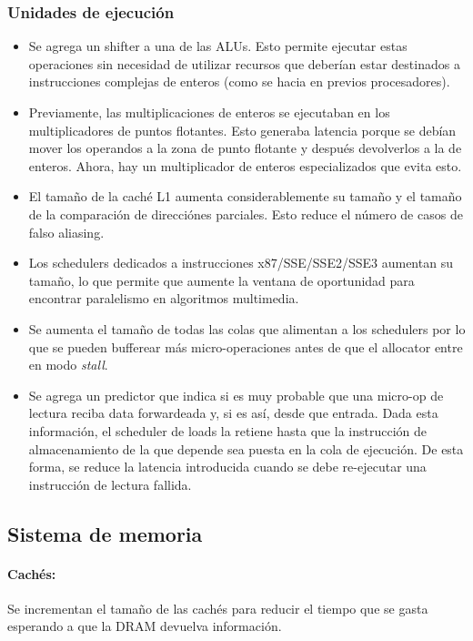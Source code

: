 \subsubsection{Unidades de ejecución}
\begin{itemize}
\item Se agrega un shifter a una de las ALUs. Esto permite ejecutar estas operaciones  sin necesidad de utilizar recursos que deberían estar destinados a instrucciones complejas de enteros (como se hacia en previos procesadores).

\item Previamente, las multiplicaciones de enteros se ejecutaban en los multiplicadores de puntos flotantes. Esto generaba latencia porque se debían mover los operandos a la zona de punto flotante y después devolverlos a la de enteros. Ahora, hay un multiplicador de enteros especializados que evita esto.

\item El tamaño de la caché L1 aumenta considerablemente su tamaño y el tamaño de la comparación de direcciónes parciales. Esto reduce el número de casos de falso aliasing.

\item Los schedulers dedicados a instrucciones x87/SSE/SSE2/SSE3 aumentan su tamaño, lo que permite que aumente la ventana de oportunidad para encontrar paralelismo en algoritmos multimedia. 

\item Se aumenta el tamaño de todas las colas que alimentan a los schedulers por lo que se pueden bufferear más micro-operaciones antes de que el allocator entre en modo \textit{stall}.

\item Se agrega un predictor que indica si es muy probable que una micro-op de lectura reciba data forwardeada y, si es así, desde que entrada. Dada esta información, el scheduler de loads la retiene hasta que la instrucción de almacenamiento de la que depende sea puesta en la cola de ejecución. De esta forma, se reduce la latencia introducida cuando se debe re-ejecutar una instrucción de lectura fallida.
\end{itemize}

\subsection{Sistema de memoria}\label{secc::intel::90um::memoria}
\paragraph{Cachés:} Se incrementan el tamaño de las cachés para reducir el tiempo que se gasta esperando a que la DRAM devuelva información.

